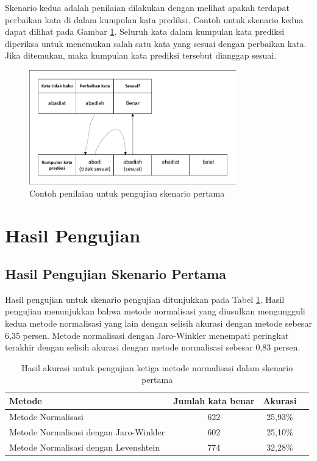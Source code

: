 Skenario kedua adalah penilaian dilakukan dengan melihat apakah terdapat perbaikan kata di dalam kumpulan kata prediksi. Contoh untuk skenario kedua dapat dilihat pada Gambar \ref{fig:skenario2_eg}. Seluruh kata dalam kumpulan kata prediksi diperiksa untuk menemukan salah satu kata yang sesuai dengan perbaikan kata. Jika ditemukan, maka kumpulan kata prediksi tersebut dianggap sesuai.
\begin{figure}[ht]
	\centering
	\includegraphics[width=0.8\textwidth, trim=2 2 2 2, clip]{resources/4/skenario2_eg.pdf}
	\caption{Contoh penilaian untuk pengujian skenario pertama}
	\label{fig:skenario2_eg}
\end{figure}

\section{Hasil Pengujian}

\subsection{Hasil Pengujian Skenario Pertama}

Hasil pengujian untuk skenario pengujian ditunjukkan pada Tabel \ref{tbl:result_1}. Hasil pengujian menunjukkan bahwa metode normalisasi yang diusulkan mengungguli kedua metode normalisasi yang lain dengan selisih akurasi dengan metode \parencite{saragih2017normalisasi} sebesar 6,35 persen. Metode normalisasi dengan Jaro-Winkler menempati peringkat terakhir dengan selisih akurasi dengan metode normalisasi \parencite{saragih2017normalisasi} sebesar 0,83 persen.
\begin{table}[ht]
    \captionsetup{justification=justified,singlelinecheck=false}
    \caption{Hasil akurasi untuk pengujian ketiga metode normalisasi dalam skenario pertama}
    \label{tbl:result_1}
    \centering
    \begin{tabularx}{\textwidth}{|X|c|c|c|}
        \hline
        \multicolumn{1}{|Y|}{\textbf{Metode}} & \textbf{Jumlah kata benar} & \textbf{Akurasi} \\ \hline
        Metode Normalisasi \parencite{saragih2017normalisasi} & 622 & 25,93\% \\ \hline
        Metode Normalisasi dengan Jaro-Winkler & 602 & 25,10\% \\ \hline
        Metode Normalisasi dengan Levenshtein & 774 & 32,28\% \\ \hline
    \end{tabularx}
\end{table}

